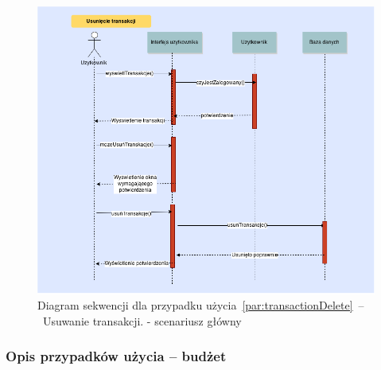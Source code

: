 \begin{figure}[H]
    \includegraphics[width=\textwidth,
    height=0.5\textheight]{images/usun_transakcje.png}
    \caption{Diagram sekwencji dla przypadku użycia~\ref{par:transactionDelete}~--~Usuwanie transakcji.
    - scenariusz główny}
\end{figure}

\subsubsection{Opis przypadków użycia -- budżet}
